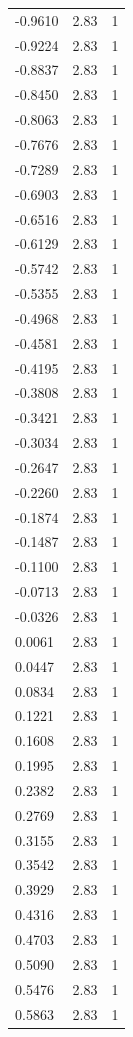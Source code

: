 \begin{longtable}{lrr}
  -0.9610 & 2.83 & 1 \\
  -0.9224 & 2.83 & 1 \\
  -0.8837 & 2.83 & 1 \\
  -0.8450 & 2.83 & 1 \\
  -0.8063 & 2.83 & 1 \\
  -0.7676 & 2.83 & 1 \\
  -0.7289 & 2.83 & 1 \\
  -0.6903 & 2.83 & 1 \\
  -0.6516 & 2.83 & 1 \\
  -0.6129 & 2.83 & 1 \\
  -0.5742 & 2.83 & 1 \\
  -0.5355 & 2.83 & 1 \\
  -0.4968 & 2.83 & 1 \\
  -0.4581 & 2.83 & 1 \\
  -0.4195 & 2.83 & 1 \\
  -0.3808 & 2.83 & 1 \\
  -0.3421 & 2.83 & 1 \\
  -0.3034 & 2.83 & 1 \\
  -0.2647 & 2.83 & 1 \\
  -0.2260 & 2.83 & 1 \\
  -0.1874 & 2.83 & 1 \\
  -0.1487 & 2.83 & 1 \\
  -0.1100 & 2.83 & 1 \\
  -0.0713 & 2.83 & 1 \\
  -0.0326 & 2.83 & 1 \\
  0.0061 & 2.83 & 1 \\
  0.0447 & 2.83 & 1 \\
  0.0834 & 2.83 & 1 \\
  0.1221 & 2.83 & 1 \\
  0.1608 & 2.83 & 1 \\
  0.1995 & 2.83 & 1 \\
  0.2382 & 2.83 & 1 \\
  0.2769 & 2.83 & 1 \\
  0.3155 & 2.83 & 1 \\
  0.3542 & 2.83 & 1 \\
  0.3929 & 2.83 & 1 \\
  0.4316 & 2.83 & 1 \\
  0.4703 & 2.83 & 1 \\
  0.5090 & 2.83 & 1 \\
  0.5476 & 2.83 & 1 \\
  0.5863 & 2.83 & 1 \\

\end{longtable}
